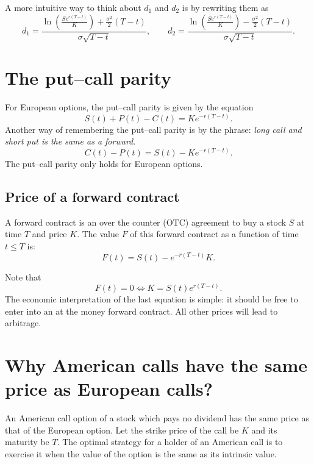 \documentclass{amsart}
\theoremstyle{plain}
\numberwithin{equation}{section}
\begin{document}
A more intuitive way to think about $d_1$ and 
$d_2$ is by rewriting them as
\begin{equation}
d_1 = \frac{\ln(\frac{S e^{r(T-t)}}{K}) + \frac{\sigma^2}{2}(T-t)}{\sigma \sqrt{T-t}}, \qquad 
d_2 = \frac{\ln(\frac{S e^{r(T-t)}}{K}) - \frac{\sigma^2}{2}(T-t)}{\sigma \sqrt{T-t}}.
\end{equation}
\section*{The put--call parity}
For European options, the put--call
parity is given by the equation
\begin{equation}
S(t) + P(t) - C(t) = K e^{-r(T-t)}.
\end{equation}
Another way of remembering the put--call parity is by the 
phrase: 
\emph{long call and short put is the same as a forward}.
\begin{equation}
C(t) - P(t) = S(t) - K e^{-r(T-t)}.
\end{equation}
The put--call parity only holds for European options. 
\subsection{Price of a forward contract}
A forward contract is an over the counter (OTC) 
agreement to buy a stock $S$ at time $T$
and price $K$. The value $F$ of this forward 
contract as a function of time $t \leq T$ is:
\begin{equation}
F(t) = S(t) - e^{-r(T-t)}K.
\end{equation}

Note that 
\begin{equation*}
F(t)=0 \iff K = S(t) e^{r(T-t)}.
\end{equation*}
The economic interpretation of the last 
equation is simple: it should be free to 
enter into an at the money forward 
contract. All other prices will lead
to arbitrage. 

\section*{Why American calls have the same price as European calls?}
An American call option of a stock which pays no dividend has the same price 
as that of the European option. Let the strike price of the call be $K$ and its maturity be $T$. 
The optimal strategy for a holder of an American call is to exercise it when the value of the 
option is the same as its intrinsic value. 
\end{document}
